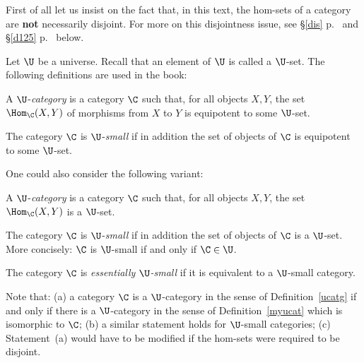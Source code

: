 \documentclass[12pt]{article}
\theoremstyle{remark}
\theoremstyle{definition}
\begin{document}
\begin{s}
First of all let us insist on the fact that, in this text, the hom-sets of a category are \textbf{not} necessarily disjoint. For more on this disjointness issue, see \S\ref{dis} p.~\pageref{dis} and \S\ref{d125} p.~\pageref{d125} below. %
\end{s}

Let $\U$ be a universe. Recall that an element of $\U$ is called a $\U$-set. The following definitions are used in the book: 

\begin{df}[$\U$-category] 
A $\U$-{\em category} is a category $\C$ such that, for all objects $X,Y$, the set $\Hom_\C(X,Y)$ of morphisms from $X$ to $Y$ is equipotent to some $\U$-set. 
\end{df} 

\begin{df} 
The category $\C$ is $\U$-{\em small} if in addition the set of objects of $\C$ is equipotent to some $\U$-set. 
\end{df} 

One could also consider the following variant: 

\begin{df}[$\U$-category] 
A $\U$-{\em category} is a category $\C$ such that, for all objects $X,Y$, the set $\Hom_\C(X,Y)$ is a $\U$-set. 
\end{df} 

\begin{df}
The category $\C$ is $\U$-{\em small} if in addition the set of objects of $\C$ is a $\U$-set. More concisely: $\C$ is $\U$-small if and only if $\C\in\U$. 
\end{df}

\begin{df}
The category $\C$ is \emph{essentially $\U$-small} if it is equivalent to a $\U$-small category. 
\end{df} 

Note that: (a) a category $\C$ is a $\U$-category in the sense of Definition~\ref{ucatg} if and only if there is a $\U$-category in the sense of Definition~\ref{myucat} which is isomorphic to $\C$; (b) a similar statement holds for $\U$-small categories; (c) Statement~(a) would have to be modified if the hom-sets were required to be disjoint. 
\begin{center}
\end{center}
\end{document}
